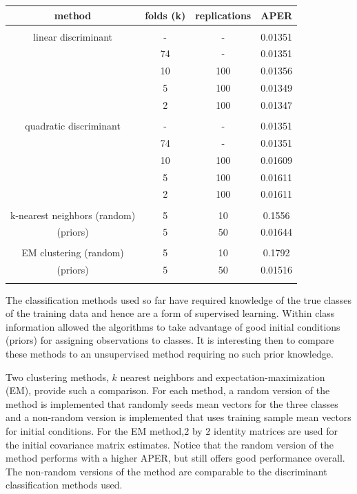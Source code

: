 \begin{enumerate}
\begin{center}
\begin{tabular}{| c | c c c |}
	\hline
	method & folds (k) & replications & APER \\
	\hline
	&&&\\
	linear discriminant & - & - & 0.01351 \\
	& 74 & - & 0.01351 \\
	& 10 & 100 & 0.01356 \\
	& 5 & 100 & 0.01349 \\
	& 2 & 100 & 0.01347 \\
	&&&\\
	quadratic discriminant & - & - & 0.01351 \\
	& 74 & - & 0.01351 \\
	& 10 & 100 & 0.01609 \\
	& 5 & 100 & 0.01611 \\
	& 2 & 100 & 0.01611 \\
	&&&\\
	k-nearest neighbors (random) & 5 & 10 & 0.1556 \\
	(priors) & 5 & 50 & 0.01644 \\
	&&&\\
	EM clustering (random) & 5 & 10 & 0.1792 \\
	(priors) & 5 & 50 & 0.01516 \\
	&&&\\
	\hline
\end{tabular}
\end{center}

	The classification methods used so far have required knowledge of the true classes of the training data and hence are a form of supervised learning. Within class information allowed the algorithms to take advantage of good initial conditions (priors) for assigning observations to classes. It is interesting then to compare these methods to an unsupervised method requiring no such prior knowledge. 
	
	Two clustering methods, $k$ nearest neighbors and expectation-maximization (EM), provide such a comparison. For each method, a random version of the method is implemented that randomly seeds mean vectors for the three classes and a non-random version is implemented that uses training sample mean vectors for initial conditions. For the EM method,$2$ by $2$ identity matrices are used for the initial covariance matrix estimates. Notice that the random version of the method performs with a higher APER, but still offers good performance overall. The non-random versions of the method are comparable to the discriminant classification methods used.

\end{enumerate}

